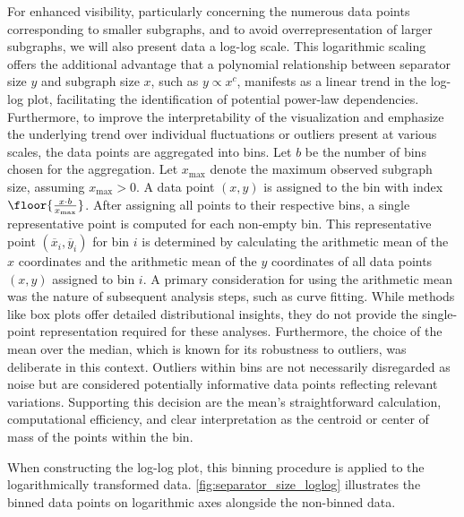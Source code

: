 For enhanced visibility, particularly concerning the numerous data points corresponding to smaller subgraphs, and to avoid overrepresentation of larger subgraphs, we will also present data a log-log scale.
This logarithmic scaling offers the additional advantage that a polynomial relationship between separator size \( y \) and subgraph size \( x \), such as \( y \propto x^c \), manifests as a linear trend in the log-log plot, facilitating the identification of potential power-law dependencies.
Furthermore, to improve the interpretability of the visualization and emphasize the underlying trend over individual fluctuations or outliers present at various scales, the data points are aggregated into bins.
Let \( b \) be the number of bins chosen for the aggregation.
Let \( x_{\max} \) denote the maximum observed subgraph size, assuming \( x_{\max} > 0 \).
A data point \( (x, y) \) is assigned to the bin with index \( \floor{\frac{x \cdot b}{x_{\max}}} \).
After assigning all points to their respective bins, a single representative point is computed for each non-empty bin.
This representative point \( (\overline{x}_i, \overline{y}_i) \) for bin \( i \) is determined by calculating the arithmetic mean of the \( x \) coordinates and the arithmetic mean of the \( y \) coordinates of all data points \( (x, y) \) assigned to bin \( i \).
A primary consideration for using the arithmetic mean was the nature of subsequent analysis steps, such as curve fitting.
While methods like box plots offer detailed distributional insights, they do not provide the single-point representation required for these analyses.
Furthermore, the choice of the mean over the median, which is known for its robustness to outliers, was deliberate in this context.
Outliers within bins are not necessarily disregarded as noise but are considered potentially informative data points reflecting relevant variations.
Supporting this decision are the mean's straightforward calculation, computational efficiency, and clear interpretation as the centroid or center of mass of the points within the bin.

When constructing the log-log plot, this binning procedure is applied to the logarithmically transformed data.
\cref{fig:separator_size_loglog} illustrates the binned data points on logarithmic axes alongside the non-binned data.

